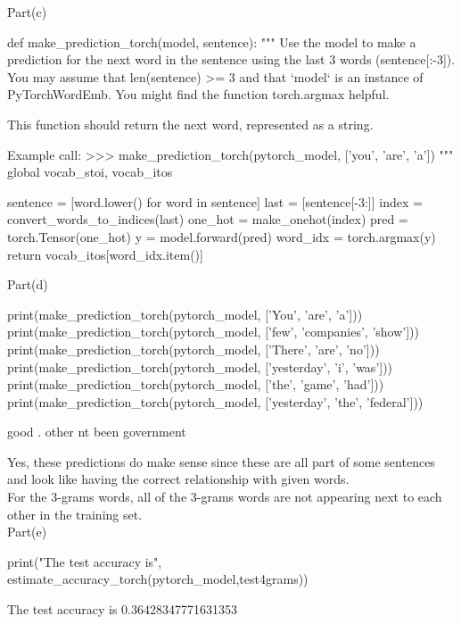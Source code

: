 \documentclass[12pt]{article}
\begin{document}
Part(c)\\
\begin{python}
def make_prediction_torch(model, sentence):
    """
    Use the model to make a prediction for the next word in the
    sentence using the last 3 words (sentence[:-3]). You may assume
    that len(sentence) >= 3 and that `model` is an instance of
    PyTorchWordEmb. You might find the function torch.argmax helpful.

    This function should return the next word, represented as a string.

    Example call:
    >>> make_prediction_torch(pytorch_model, ['you', 'are', 'a'])
    """
    global vocab_stoi, vocab_itos

    sentence = [word.lower() for word in sentence]
    last = [sentence[-3:]]
    index = convert_words_to_indices(last)
    one_hot = make_onehot(index)
    pred = torch.Tensor(one_hot)
    y = model.forward(pred)
    word_idx = torch.argmax(y)
    return vocab_itos[word_idx.item()]
\end{python}

Part(d)\\
\begin{python}
print(make_prediction_torch(pytorch_model, ['You', 'are', 'a']))
print(make_prediction_torch(pytorch_model, ['few', 'companies', 'show'])) 
print(make_prediction_torch(pytorch_model, ['There', 'are', 'no']))
print(make_prediction_torch(pytorch_model, ['yesterday', 'i', 'was']))
print(make_prediction_torch(pytorch_model, ['the', 'game', 'had'])) 
print(make_prediction_torch(pytorch_model, ['yesterday', 'the', 'federal']))
\end{python}
\begin{python}
good
.
other
nt
been
government
\end{python}
Yes, these predictions do make sense since these are all part of some sentences and look like having the correct relationship with given words.\\
For the 3-grams words, all of the 3-grams words are not appearing next to each other in the training set.\\

Part(e)\\
\begin{python}
print("The test accuracy is", estimate_accuracy_torch(pytorch_model,test4grams))
\end{python}
\begin{python}
The test accuracy is 0.36428347771631353
\end{python}
\end{document}
